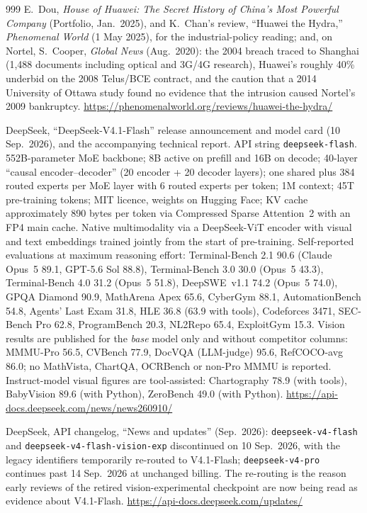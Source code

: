 \begin{thebibliography}{999}
 E.~Dou, \emph{House of Huawei: The Secret History of China's Most Powerful Company} (Portfolio, Jan.\ 2025), and K.~Chan's review, ``Huawei the Hydra,'' \emph{Phenomenal World} (1 May 2025), for the industrial-policy reading; and, on Nortel, S.~Cooper, \emph{Global News} (Aug.\ 2020): the 2004 breach traced to Shanghai (1{,}488 documents including optical and 3G/4G research), Huawei's roughly 40\% underbid on the 2008 Telus/BCE contract, and the caution that a 2014 University of Ottawa study found no evidence that the intrusion caused Nortel's 2009 bankruptcy. \url{https://phenomenalworld.org/reviews/huawei-the-hydra/}


 DeepSeek, ``DeepSeek-V4.1-Flash'' release announcement and model card (10 Sep.\ 2026), and the accompanying technical report. API string \texttt{deepseek-flash}. 552B-parameter MoE backbone; 8B active on prefill and 16B on decode; 40-layer ``causal encoder--decoder'' (20 encoder + 20 decoder layers); one shared plus 384 routed experts per MoE layer with 6 routed experts per token; 1M context; 45T pre-training tokens; MIT licence, weights on Hugging Face; KV cache approximately 890 bytes per token via Compressed Sparse Attention~2 with an FP4 main cache. Native multimodality via a DeepSeek-ViT encoder with visual and text embeddings trained jointly from the start of pre-training. Self-reported evaluations at maximum reasoning effort: Terminal-Bench 2.1 90.6 (Claude Opus~5 89.1, GPT-5.6 Sol 88.8), Terminal-Bench 3.0 30.0 (Opus~5 43.3), Terminal-Bench 4.0 31.2 (Opus~5 51.8), DeepSWE~v1.1 74.2 (Opus~5 74.0), GPQA Diamond 90.9, MathArena Apex 65.6, CyberGym 88.1, AutomationBench 54.8, Agents' Last Exam 31.8, HLE 36.8 (63.9 with tools), Codeforces 3471, SEC-Bench Pro 62.8, ProgramBench 20.3, NL2Repo 65.4, ExploitGym 15.3. Vision results are published for the \emph{base} model only and without competitor columns: MMMU-Pro 56.5, CVBench 77.9, DocVQA (LLM-judge) 95.6, RefCOCO-avg 86.0; no MathVista, ChartQA, OCRBench or non-Pro MMMU is reported. Instruct-model visual figures are tool-assisted: Chartography 78.9 (with tools), BabyVision 89.6 (with Python), ZeroBench 49.0 (with Python). \url{https://api-docs.deepseek.com/news/news260910/}

 DeepSeek, API changelog, ``News and updates'' (Sep.\ 2026): \texttt{deepseek-v4-flash} and \texttt{deepseek-v4-flash-vision-exp} discontinued on 10 Sep.\ 2026, with the legacy identifiers temporarily re-routed to V4.1-Flash; \texttt{deepseek-v4-pro} continues past 14 Sep.\ 2026 at unchanged billing. The re-routing is the reason early reviews of the retired vision-experimental checkpoint are now being read as evidence about V4.1-Flash. \url{https://api-docs.deepseek.com/updates/}


\end{thebibliography}
